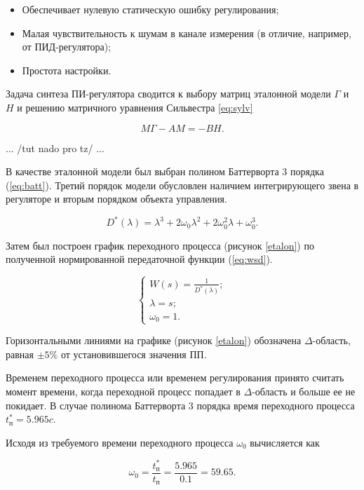 \begin{itemize}
  \item Обеспечивает нулевую статическую ошибку регулирования;
  \item Малая чувствительность к шумам в канале измерения (в отличие, например, от ПИД-регулятора);
  \item Простота настройки.
\end{itemize}

Задача синтеза ПИ-регулятора сводится к выбору матриц эталонной модели $\Gamma$ и $H$ и 
решению матричного уравнения Сильвестра \ref{eq:sylv}

\begin{equation}
  M\Gamma-AM=-BH.
  \label{eq:sylv}
\end{equation}

... /tut nado pro tz/ ... %

В качестве эталонной модели был выбран полином Баттерворта 3 порядка (\ref{eq:batt}). Третий порядок
модели обусловлен наличием интегрирующего звена в регуляторе и вторым порядком
объекта управления.

\begin{equation}
  D^{\text{*}}(\lambda)=\lambda^3+2\omega_0\lambda^2+2\omega_0^2\lambda+\omega_0^3.
  \label{eq:batt}
\end{equation}

Затем был построен график переходного процесса (рисунок \ref{etalon}) по полученной нормированной 
передаточной функции (\ref{eq:wsd}).

\begin{equation}
  \begin{cases}
    W(s)=\frac{1}{D^{\text{*}}(\lambda)};
    \\
    \lambda=s;
    \\
    \omega_0=1.
  \end{cases}
  \label{eq:wsd}
\end{equation}


Горизонтальными линиями на графике (рисунок \ref{etalon}) обозначена $\Delta$-область, равная
$\pm5\%$ от установившегося значения ПП.

Временем переходного процесса или временем регулирования принято считать момент времени, когда
переходной процесс попадает в $\Delta$-область и больше ее не покидает. В случае полинома Баттерворта
3 порядка время переходного процесса $t_{\text{п}}^{\text{*}}=5.965 c$.

Исходя из требуемого времени переходного процесса $\omega_0$ вычисляется как

$$
  \omega_0=\frac{t_{\text{п}}^{\text{*}}}{t_{\text{п}}}=\frac{5.965}{0.1}=59.65.
$$
